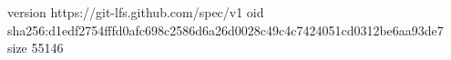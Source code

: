 version https://git-lfs.github.com/spec/v1
oid sha256:d1edf2754fffd0afc698c2586d6a26d0028c49c4c7424051cd0312be6aa93de7
size 55146
